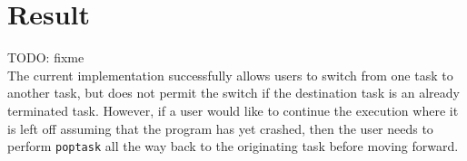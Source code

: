 \section{Result}
TODO: fixme\\
The current implementation successfully allows users to switch from one task to
another task, but does not permit the switch if the destination task is an already terminated
task. However, if a user would like to continue the execution where it is left
off assuming that the program has yet crashed, then the user needs to perform
\verb|poptask| all the way back to the originating task before moving forward.
